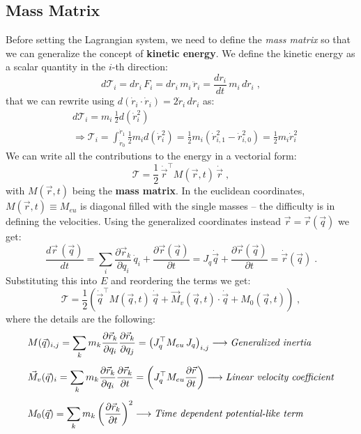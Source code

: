 \documentclass[12pt,a4paper]{article}
\begin{document}
\subsection{Mass Matrix}
Before setting the Lagrangian system, we need to define the \textit{mass matrix} so that we can generalize the concept of \textbf{kinetic energy}.
We define the kinetic energy as a scalar quantity in the $i$-th direction:
\begin{equation*}
	d\mathcal{T}_i = dr_i \, F_i = dr_i \, m_i \, \ddot{r}_i = \frac{dr_i}{dt}\, m_i \, d\dot{r}_i \;,
\end{equation*}
that we can rewrite using $d(\dot{r}_i\cdot \dot{r}_i) = 2\dot{r}_i\,dr_i$ as:
\begin{align*}
	&d\mathcal{T}_i = m_i \, \frac{1}{2}d(\dot{r}_i^2)\\[5pt]
	&\Rightarrow \mathcal{T}_i = \int_{\dot{r}_0}^{\dot{r}_1}\frac{1}{2} m_i d(\dot{r}_i^2) = \frac{1}{2} m_i (\dot{r}_{i,1}^2 - \dot{r}_{i,0}^2) = \frac{1}{2} m_i \dot{r}_i^2
\end{align*}
We can write all the contributions to the energy in a vectorial form:
\begin{equation*}
\mathcal{T} = \frac{1}{2} \, \dot{\vec{r}}^\top M(\vec{r},t) \, \dot{\vec{r}}\; ,
\end{equation*}
with $M(\vec{r},t)$ being the \textbf{mass matrix}. In the euclidean coordinates, $M(\vec{r},t)\equiv M_{eu}$ is diagonal filled with the single masses -- the difficulty is in defining the velocities. Using the generalized coordinates instead $\vec{r}=\vec{r}(\vec{q})$ we get:
\begin{equation*}
\dfrac{d\vec{r}\, (\vec{q})}{dt} = \sum_{i} \dfrac{\partial \vec{r}_k}{\partial q_i} \, \dot{q}_i + \dfrac{\partial \vec{r}(\vec{q})}{\partial t} = J_q\dot{\vec{q}} + \dfrac{\partial \vec{r}(\vec{q})}{\partial t} = \dot{\vec{r}}(\vec{q})\;.
\end{equation*}
Substituting this into $E$ and reordering the terms we get:
\begin{equation*}
	\mathcal{T} = \frac{1}{2}\left( \dot{\vec{q}}^\top M(\vec{q},t) \, \dot{\vec{q}} + \vec{M}_v(\vec{q},t)\cdot \dot{\vec{q}} + M_0(\vec{q},t) \right)\;,
\end{equation*}
where the details are the following:
\begin{align*}
	&M(\vec{q})_{i,j} = \sum_{k} m_k \dfrac{\partial \vec{r}_k}{\partial q_i} \dfrac{\partial \vec{r}_k}{\partial q_j} = \left(J_q^\top M_{eu} \,J_q\right)_{i,j} \longrightarrow \text{\textit{Generalized inertia}}\\[4pt]
	&\vec{M}_v(\vec{q})_i = \sum_{k} m_k \dfrac{\partial \vec{r}_k}{\partial q_i} \dfrac{\partial \vec{r}_k}{\partial t} = \left(J_q^\top M_{eu}\dfrac{\partial \vec{r}}{\partial t}\right) \longrightarrow \text{\textit{Linear velocity coefficient}} \\[4pt]
	&M_0(\vec{q}) = \sum_{k} m_k \left(\dfrac{\partial \vec{r}_k}{\partial t}\right)^2 \longrightarrow \text{\textit{Time dependent potential-like term}}
\end{align*}
\end{document}
